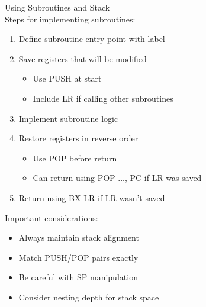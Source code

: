 \begin{KR}{Using Subroutines and Stack}\\
Steps for implementing subroutines:
\begin{enumerate}
  \item Define subroutine entry point with label
  \item Save registers that will be modified
    \begin{itemize}
      \item Use PUSH at start
      \item Include LR if calling other subroutines
    \end{itemize}
  \item Implement subroutine logic
  \item Restore registers in reverse order
    \begin{itemize}
      \item Use POP before return
      \item Can return using POP {..., PC} if LR was saved
    \end{itemize}
  \item Return using BX LR if LR wasn't saved
\end{enumerate}
\end{KR}

\begin{remark}
Important considerations:
\begin{itemize}
  \item Always maintain stack alignment
  \item Match PUSH/POP pairs exactly
  \item Be careful with SP manipulation
  \item Consider nesting depth for stack space
\end{itemize}
\end{remark}